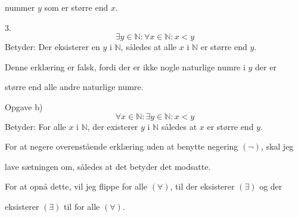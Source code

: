 \documentclass{article}
\begin{document}
nummer $y$ som er større end $x$. 
 \vspace{10pt}

3. 
$$\exists y \in \mathbb{N}: \forall x \in \mathbb{N}: x < y$$ 
Betyder: Der eksisterer en $y$ i $\mathbb{N}$, således at alle $x$ i $\mathbb{N}$ er større end $y$. 
\vspace{10pt}

Denne erklæring er falsk, fordi der er ikke nogle naturlige numre i $y$ der er 

større end alle andre naturlige numre. 
\vspace{12pt}
 
\vspace{12pt}
 
\vspace{12pt}
  
\vspace{12pt}
   
\vspace{12pt}
  
\vspace{12pt}

\vspace{12pt}

\vspace{12pt}

\vspace{12pt}

\vspace{12pt}

\vspace{12pt}

\vspace{12pt}

Opgave b) 
 \vspace{10pt}
$$ \forall x \in \mathbb{N }: \exists y \in \mathbb{N}: x < y $$ Betyder: For alle $x$ i $\mathbb{N}$, der existerer $y$ i $\mathbb{N}$ således at $x$ er større end $y$.
 \vspace{10pt}

 For at negere overenstående erklæring uden at benytte negering $(\neg)$, skal jeg 
 
 lave sætningen om, således at det betyder det modsatte. 
 \vspace{10pt}
 
For at opnå dette, vil jeg flippe for alle $(\forall)$, til der eksisterer $(\exists)$ og der 

eksisterer $(\exists)$ til for alle $(\forall)$. 
 \vspace{10pt}
 
\end{document}
